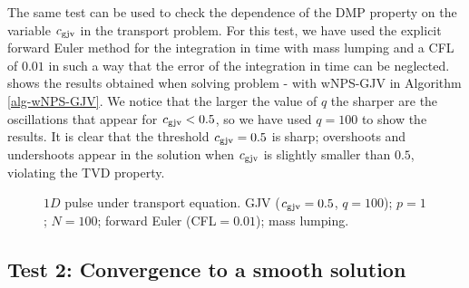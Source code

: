 The same test can be used to check the dependence of the DMP property on the variable $c_{\rm gjv}$ in the transport problem.  For this test, we have used the explicit forward Euler method for the integration in time with mass lumping and a CFL of $0.01$ in such a way that the error of the integration in time can be neglected.  shows the results obtained when solving problem - with  wNPS-GJV in Algorithm \ref{alg-wNPS-GJV}. We notice that the larger the value of $q$ the sharper are the oscillations that appear for $c_{\rm gjv} < 0.5$, so we have used $q=100$ to show the results. It is clear that the threshold $c_{\rm gjv} = 0.5$ is sharp; overshoots and undershoots appear in the solution when $c_{\rm gjv}$ is slightly smaller than $0.5$, violating the TVD property.
\begin{figure}%
\centering
{}%
%
\caption{$1D$ pulse under transport equation. GJV ($c_{\rm gjv}=0.5$, $q=100$); $p=1$; $N=100$; forward Euler (CFL$=0.01$); mass lumping.}\label{fig-SZ_AD_2}%
\end{figure}


\subsection{Test 2: Convergence to a smooth solution}

